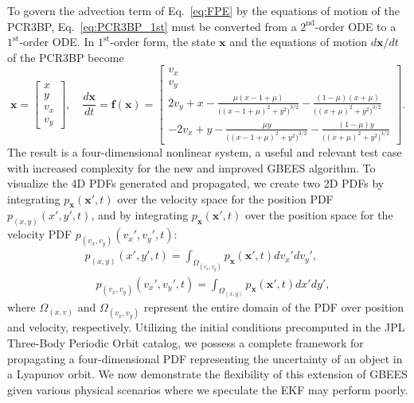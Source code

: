 \documentclass[paper,11pt]{AAS}
\begin{document}
To govern the advection term of Eq.~\eqref{eq:FPE} by the equations of motion of the PCR3BP, Eq.~\eqref{eq:PCR3BP_1st} must be converted from a $2^{\textrm{nd}}$-order ODE to a $1^{\textrm{st}}$-order ODE. In $1^{\textrm{st}}$-order form, the state $\mathbf{x}$ and the equations of motion $d\mathbf{x}/dt$ of the PCR3BP become
\begin{equation}\label{eq:PCR3BP_1st}
    \mathbf{x} = \begin{bmatrix}x\\y\\v_x\\v_y\end{bmatrix}, \quad \frac{d\mathbf{x}}{dt} = \mathbf{f}(\mathbf{x}) = \begin{bmatrix}
v_x \\[0.25em] v_y \\[0.25em] 2v_y + x - \frac{\mu(x-1+\mu)}{\Big((x-1+\mu)^2+y^2\Big)^{3/2}}-\frac{(1-\mu)(x+\mu)}{\Big((x+\mu)^2+y^2\Big)^{3/2}} \\[0.25em] -2v_x + y - \frac{\mu y}{\Big((x-1+\mu)^2+y^2\Big)^{3/2}}-\frac{(1-\mu) y}{\Big((x+\mu)^2+y^2\Big)^{3/2}}
\end{bmatrix}.
\end{equation}
The result is a four-dimensional nonlinear system, a useful and relevant test case with increased complexity for the new and improved GBEES algorithm. To visualize the 4D PDFs generated and propagated, we create two 2D PDFs by integrating $p_{\mathbf{x}}(\mathbf{x}',t)$ over the velocity space for the position PDF $p_{(x,y)}(x',y',t)$, and by integrating $p_{\mathbf{x}}(\mathbf{x}',t)$ over the position space for the velocity PDF $p_{(v_x,v_y)}(v_x',v_y',t)$:
\begin{subequations}
\begin{gather}
    p_{(x,y)}(x',y',t) = \int_{\Omega_{(v_x,v_y)}} p_{\mathbf{x}}(\mathbf{x}',t)dv_x'dv_y', \\ 
    \quad p_{(v_x,v_y)}(v_x',v_y',t) = \int_{\Omega_{(x,y)}} p_{\mathbf{x}}(\mathbf{x}',t)dx'dy',
\end{gather}
\end{subequations}
where $\Omega_{(x,v)}$ and $\Omega_{(v_x,v_y)}$ represent the entire domain of the PDF over position and velocity, respectively. Utilizing the initial conditions precomputed in the JPL Three-Body Periodic Orbit catalog, we possess a complete framework for propagating a four-dimensional PDF representing the uncertainty of an object in a Lyapunov orbit. We now demonstrate the flexibility of this extension of GBEES given various physical scenarios where we speculate the EKF may perform poorly. 
\end{document}
